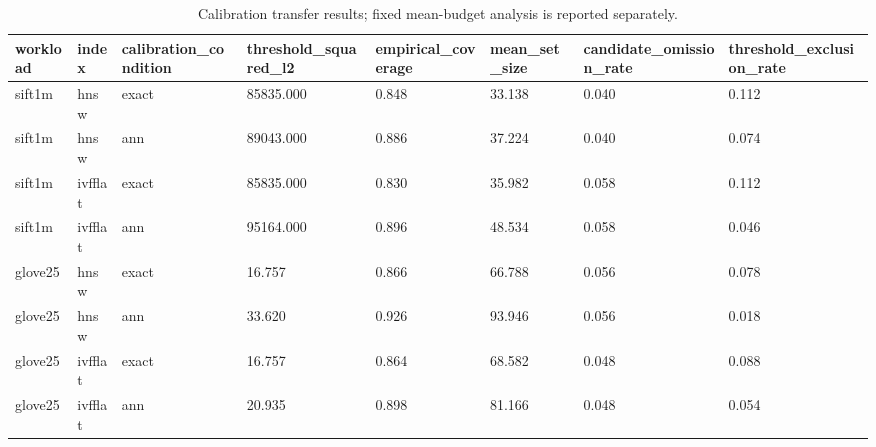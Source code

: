 \begin{table}[t]
\centering
\caption{Calibration transfer results; fixed mean-budget analysis is reported separately.}
\label{tab:transfer}
\begin{tabular}{llllllll}
\hline
workload & index & calibration_condition & threshold_squared_l2 & empirical_coverage & mean_set_size & candidate_omission_rate & threshold_exclusion_rate \\
\hline
sift1m & hnsw & exact & 85835.000 & 0.848 & 33.138 & 0.040 & 0.112 \\
sift1m & hnsw & ann & 89043.000 & 0.886 & 37.224 & 0.040 & 0.074 \\
sift1m & ivfflat & exact & 85835.000 & 0.830 & 35.982 & 0.058 & 0.112 \\
sift1m & ivfflat & ann & 95164.000 & 0.896 & 48.534 & 0.058 & 0.046 \\
glove25 & hnsw & exact & 16.757 & 0.866 & 66.788 & 0.056 & 0.078 \\
glove25 & hnsw & ann & 33.620 & 0.926 & 93.946 & 0.056 & 0.018 \\
glove25 & ivfflat & exact & 16.757 & 0.864 & 68.582 & 0.048 & 0.088 \\
glove25 & ivfflat & ann & 20.935 & 0.898 & 81.166 & 0.048 & 0.054 \\
\hline
\end{tabular}
\end{table}
